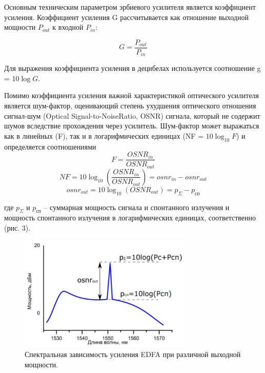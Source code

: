 \documentclass[12pt,a4paper]{article}
\begin{document}
Основным техническим параметром эрбиевого усилителя является коэффициент усиления. Коэффициент усиления G рассчитывается как отношение выходной мощности $P_{out}$ к входной $P_{in}$:

\begin{equation}
    G = \frac{P_{out}}{P_{in}}
\end{equation}

Для выражения коэффициента усиления в децибелах используется соотношение g = 10$\log G$. 

Помимо коэффициента усиления важной характеристикой оптического усилителя является шум-фактор, оценивающий степень ухудшения оптического отношения сигнал-шум (Optical Signal-to-NoiseRatio, OSNR) сигнала, который не содержит шумов вследствие прохождения через усилитель. Шум-фактор может выражаться как в линейных (F), так и в логарифмических единицах (NF = $10\log_{10}F$) и определяется соотношениями 
 	\begin{equation}
    F = \frac{OSNR_{in}}{OSNR_{out}}
 	\end{equation}
\begin{equation}
    NF = 10\log_{10}(\frac{OSNR_{in}}{OSNR_{out}}) = osnr_{in} - osnr_{out} 
\end{equation}
\begin{equation}    
    osnr_{out} = 10\log_{10}(OSNR_{out}) = p_{\Sigma} - p_{\text{сп}}
\end{equation}

где $p_{\Sigma}$ и $p_{\text{сп}}$ – суммарная мощность сигнала и спонтанного излучения и мощность спонтанного излучения в логарифмических единицах, соответственно (рис. 3).

\begin{figure}[h!]
		\centering
		\includegraphics[width=0.5\linewidth, height=5.5cm]{erb-3.jpg}
		\caption{Спектральная зависимость усиления EDFA при различной выходной мощности.}
		\label{labC}
	\end{figure}
\end{document}
